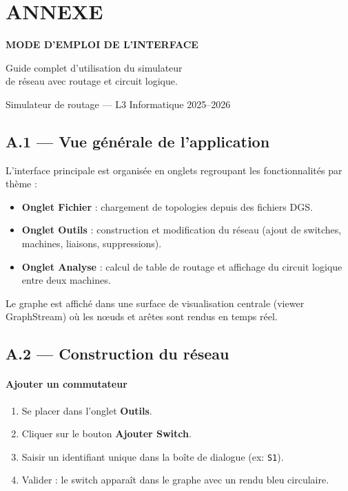 \documentclass[12pt, a4paper]{article}
\begin{document}
\newpage

\appendix

\section*{ANNEXE}

\begin{center}
\Large
\textbf{MODE D'EMPLOI DE L'INTERFACE}

\normalsize
Guide complet d'utilisation du simulateur\\de réseau avec routage et circuit logique.

\vspace{0.5cm}
\small
Simulateur de routage --- L3 Informatique 2025--2026
\end{center}

\vspace{1cm}

\subsection*{A.1 --- Vue générale de l'application}

L'interface principale est organisée en onglets regroupant les fonctionnalités par thème :
\begin{itemize}
    \item \textbf{Onglet Fichier} : chargement de topologies depuis des fichiers DGS.
    \item \textbf{Onglet Outils} : construction et modification du réseau (ajout de switches, machines, liaisons, suppressions).
    \item \textbf{Onglet Analyse} : calcul de table de routage et affichage du circuit logique entre deux machines.
\end{itemize}

Le graphe est affiché dans une surface de visualisation centrale (viewer GraphStream) où les nœuds et arêtes sont rendus en temps réel.

\subsection*{A.2 --- Construction du réseau}

\paragraph{Ajouter un commutateur}
\begin{enumerate}
    \item Se placer dans l'onglet \textbf{Outils}.
    \item Cliquer sur le bouton \textbf{Ajouter Switch}.
    \item Saisir un identifiant unique dans la boîte de dialogue (ex: \texttt{S1}).
    \item Valider : le switch apparaît dans le graphe avec un rendu bleu circulaire.
\end{enumerate}
\end{document}
